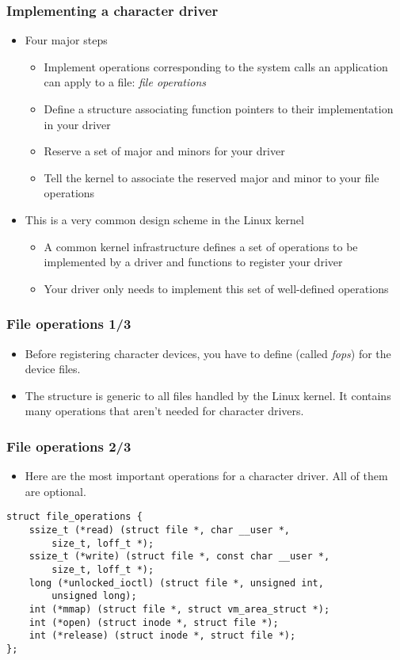\begin{frame}
  \frametitle{Implementing a character driver}
  \begin{itemize}
  \item Four major steps
    \begin{itemize}
    \item Implement operations corresponding to the system calls an
      application can apply to a file: \emph{file operations}
    \item Define a  structure associating function
      pointers to their implementation in your driver
    \item Reserve a set of major and minors for your driver
    \item Tell the kernel to associate the reserved major and minor to
      your file operations
    \end{itemize}
  \item This is a very common design scheme in the Linux kernel
    \begin{itemize}
    \item A common kernel infrastructure defines a set of operations
      to be implemented by a driver and functions to register your
      driver
    \item Your driver only needs to implement this set of well-defined
      operations
    \end{itemize}
  \end{itemize}
\end{frame}

\begin{frame}
  \frametitle{File operations 1/3}
  \begin{itemize}
  \item Before registering character devices, you have to define
     (called \emph{fops}) for the device files.
  \item The  structure is generic to all files
    handled by the Linux kernel. It contains many operations that
    aren't needed for character drivers.
  \end{itemize}
\end{frame}

\begin{frame}[fragile]
  \frametitle{File operations 2/3}
  \begin{itemize}
  \item Here are the most important operations for a character
    driver. All of them are optional.
  \end{itemize}
\begin{verbatim}
struct file_operations {
    ssize_t (*read) (struct file *, char __user *,
        size_t, loff_t *);
    ssize_t (*write) (struct file *, const char __user *,
        size_t, loff_t *);
    long (*unlocked_ioctl) (struct file *, unsigned int,
        unsigned long);
    int (*mmap) (struct file *, struct vm_area_struct *);
    int (*open) (struct inode *, struct file *);
    int (*release) (struct inode *, struct file *);
};
\end{verbatim}
\end{frame}

